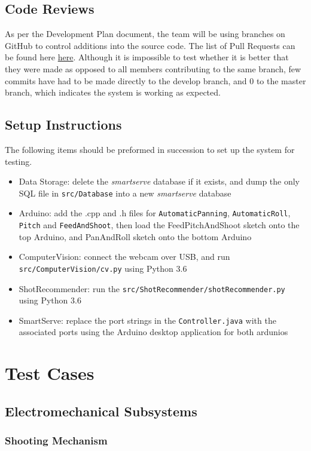 \documentclass[11pt]{article}
\begin{document}
\subsection{Code Reviews}
As per the Development Plan document, the team will be using branches on GitHub to control additions into the source code. The list of Pull Requests can be found here \href{https://github.com/ChristopherMcDonald/SoftwareTronCapstone/pulls?utf8=?&q=is\%3Apr}{here}. Although it is impossible to test whether it is better that they were made as opposed to all members contributing to the same branch, few commits have had to be made directly to the develop branch, and 0 to the master branch, which indicates the system is working as expected.
\subsection{Setup Instructions}
The following items should be preformed in succession to set up the system for testing.
\begin{itemize}
\item Data Storage: delete the \textit{smartserve} database if it exists, and dump the only SQL file in \texttt{src/Database} into a new \textit{smartserve} database
\item Arduino: add the .cpp and .h files for \texttt{AutomaticPanning}, \texttt{AutomaticRoll}, \texttt{Pitch} and \texttt{FeedAndShoot}, then load the FeedPitchAndShoot sketch onto the top Arduino, and PanAndRoll sketch onto the bottom Arduino
\item ComputerVision: connect the webcam over USB, and run \texttt{src/ComputerVision/cv.py} using Python 3.6
\item ShotRecommender: run the \texttt{src/ShotRecommender/shotRecommender.py} using Python 3.6
\item SmartServe: replace the port strings in the \texttt{Controller.java} with the associated ports using the Arduino desktop application for both ardunios
\end{itemize}
\section{Test Cases}
\subsection{Electromechanical Subsystems}
\subsubsection{Shooting Mechanism}
\end{document}
